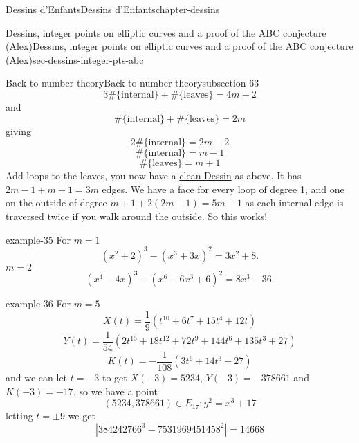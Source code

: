 \documentclass[oneside,10pt,]{book}
\numberwithin{equation}{section}
\begin{document}
\begin{chapterptx}{Dessins d'Enfants}{}{Dessins d'Enfants}{}{}{chapter-dessins}
\begin{sectionptx}{Dessins, integer points on elliptic curves and a proof of the ABC conjecture (Alex)}{}{Dessins, integer points on elliptic curves and a proof of the ABC conjecture (Alex)}{}{}{sec-dessins-integer-pts-abc}
\begin{subsectionptx}{Back to number theory}{}{Back to number theory}{}{}{subsection-63}
\begin{equation*}
3 \#\{\text{internal}\} + \#\{\text{leaves}\} =  4m - 2
\end{equation*}
and%
\begin{equation*}
\#\{\text{internal}\} + \#\{\text{leaves}\} =  2m
\end{equation*}
giving%
\begin{equation*}
2\#\{\text{internal}\} =  2m - 2
\end{equation*}
%
\begin{equation*}
\#\{\text{internal}\} =  m - 1
\end{equation*}
%
\begin{equation*}
\#\{\text{leaves}\} =  m + 1
\end{equation*}
Add loops to the leaves, you now have a \hyperref[def-clean-dessin]{clean Dessin} as above. It has \(2m- 1 + m + 1 = 3m\) edges. We have a face for every loop of degree 1, and one on the outside of degree \(m+ 1 +2(2m-1)  = 5m - 1\) as each internal edge is traversed twice if you walk around the outside. So this works!%
\begin{example}{}{example-35}%
\hypertarget{p-729}{}%
For \(m= 1\)%
\begin{equation*}
(x^2 + 2)^3 - (x^3 + 3x)^2 = 3x^2 + 8\text{.}
\end{equation*}
\(m= 2\)%
\begin{equation*}
(x^4 - 4x)^3 - (x^6 -6x^3+6)^2  = 8x^3 - 36\text{.}
\end{equation*}
%
\end{example}
\begin{example}{}{example-36}%
\hypertarget{p-730}{}%
For \(m =5\)%
\begin{equation*}
X(t) = \frac 19 (t^{10} + 6t^7 +15 t^4 + 12t)
\end{equation*}
%
\begin{equation*}
Y(t) = \frac{1}{54} (2t^{15} + 18t^{12} +72 t^9 + 144 t^6 + 135 t^3 + 27)
\end{equation*}
%
\begin{equation*}
K(t) = -\frac{1}{108} (3t^{6} + 14t^3 +27)
\end{equation*}
and we can let \(t = -3\) to get \(X(-3) = 5234\), \(Y(-3) = -378661\) and \(K(-3) = -17\), so we have a point%
\begin{equation*}
(5234, 378661) \in E_{17} \colon y^2 = x^3 + 17
\end{equation*}
letting \(t = \pm 9\) we get%
\begin{equation*}
|384242766^3 - 7531969451458^2| = 14668

\end{equation*}
\end{example}
\end{subsectionptx}
\end{sectionptx}
\end{chapterptx}
\end{document}
